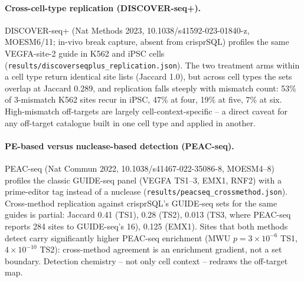 \documentclass[12pt]{article}
\begin{document}
\paragraph{Cross-cell-type replication (DISCOVER-seq+).} DISCOVER-seq+
(Nat Methods 2023, 10.1038/s41592-023-01840-z, MOESM6/11; in-vivo
break capture, absent from crisprSQL) profiles the same VEGFA-site-2
guide in K562 and iPSC cells
(\texttt{results/discoverseqplus\_replication.json}). The two treatment
arms within a cell type return identical site lists (Jaccard 1.0), but
across cell types the sets overlap at Jaccard 0.289, and replication
falls steeply with mismatch count: 53\% of 3-mismatch K562 sites
recur in iPSC, 47\% at four, 19\% at five, 7\% at six. High-mismatch
off-targets are largely cell-context-specific -- a direct caveat for
any off-target catalogue built in one cell type and applied in
another.
\paragraph{PE-based versus nuclease-based detection (PEAC-seq).}
PEAC-seq (Nat Commun 2022, 10.1038/s41467-022-35086-8, MOESM4--8)
profiles the classic GUIDE-seq panel (VEGFA TS1--3, EMX1, RNF2) with a
prime-editor tag instead of a nuclease
(\texttt{results/peacseq\_crossmethod.json}). Cross-method replication
against crisprSQL's GUIDE-seq sets for the same guides is partial:
Jaccard 0.41 (TS1), 0.28 (TS2), 0.013 (TS3, where PEAC-seq reports 284
sites to GUIDE-seq's 16), 0.125 (EMX1). Sites that both methods detect
carry significantly higher PEAC-seq enrichment (MWU $p=3\times10^{-6}$
TS1, $4\times10^{-10}$ TS2): cross-method agreement is an enrichment
gradient, not a set boundary. Detection chemistry -- not only cell
context -- redraws the off-target map.
\end{document}

